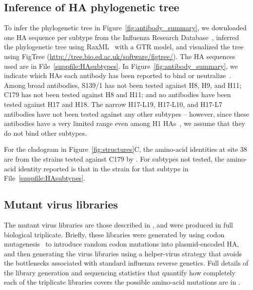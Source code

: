 \documentclass[11pt]{article}
\begin{document}
\subsection*{Inference of HA phylogenetic tree}
To infer the phylogenetic tree in Figure~\ref{fig:antibody_summary}, we downloaded one HA sequence per subtype from the Influenza Research Database~\citep{zhang2017influenza}, inferred the phylogenetic tree using RaxML~\citep{stamatakis2014raxml} with a GTR model, and visualized the tree using FigTree (\url{http://tree.bio.ed.ac.uk/software/figtree/}). 
The HA sequences used are in File~\ref{suppfile:HAsubtypes}. 
In Figure~\ref{fig:antibody_summary}, we indicate which HAs each antibody has been reported to bind or neutralize~\citep{yoshida2009cross, lee2012heterosubtypic, okuno1993common, dreyfus2013structure, corti2011neutralizing}. 
Among broad antibodies, S139/1 has not been tested against H8, H9, and H11; C179 has not been tested against H8 and H11; and no antibodies have been tested against H17 and H18.
The narrow H17-L19, H17-L10, and H17-L7 antibodies have not been tested against any other subtypes -- however, since these antibodies have a very limited range even among H1 HAs~\citep{caton1982antigenic}, we assume that they do not bind other subtypes.

For the cladogram in Figure~\ref{fig:structures}C, the amino-acid identities at site 38 are from the strains tested against C179 by \citet{dreyfus2013structure}. 
For subtypes not tested, the amino-acid identity reported is that in the strain for that subtype in File~\ref{suppfile:HAsubtypes}.

\subsection*{Mutant virus libraries}
The mutant virus libraries are those described in \citet{doud2016accurate}, and were produced in full biological triplicate.
Briefly, these libraries were generated by using codon mutagenesis~\citep{bloom2014experimentally} to introduce random codon mutations into plasmid-encoded HA, and then generating the virus libraries using a helper-virus strategy that avoids the bottlenecks associated with standard influenza reverse genetics.
Full details of the library generation and sequencing statistics that quantify how completely each of the triplicate libraries covers the possible amino-acid mutations are in \citet{doud2016accurate}.
\end{document}
